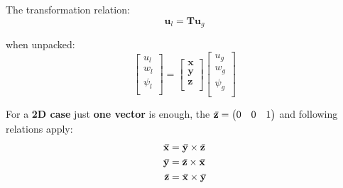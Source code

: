 \documentclass[10pt,b5paper,titlepage]{book}
\newcommand{\m}{\mathbf}
\newcommand{\closure}[2][3]{%
{}\mkern#1mu\overline{\mkern-#1mu#2}}
\newenvironment{eqarray}
{
    \begin{eqnarray}
        \begin{aligned}
}
{
        \end{aligned}
    \end{eqnarray}
}
\begin{document}
The transformation relation:
\begin{equation}
    \m{u}_l = \m{T} \m{u}_g
\end{equation}

when unpacked:
\begin{equation}
    \begin{bmatrix}
        u_l \\
        w_l \\
        \psi_l \\
    \end{bmatrix}
    = \begin{bmatrix}
        \m{x} \\
        \m{y} \\
        \m{z} \\
    \end{bmatrix}
    \begin{bmatrix}
        u_g \\
        w_g \\
        \psi_g \\
    \end{bmatrix}
\end{equation}

For a \textbf{2D case} just \textbf{one vector} is enough, the
$ \m{\closure{z}} = \begin{pmatrix} 0 & 0 & 1 \end{pmatrix} $ and following relations
apply:
\begin{eqarray}
    \m{\closure{x}} &= \m{\closure{y}} \times \m{\closure{z}} \\
    \m{\closure{y}} &= \m{\closure{z}} \times \m{\closure{x}} \\
    \m{\closure{z}} &= \m{\closure{x}} \times \m{\closure{y}} \\
\end{eqarray}
\end{document}
